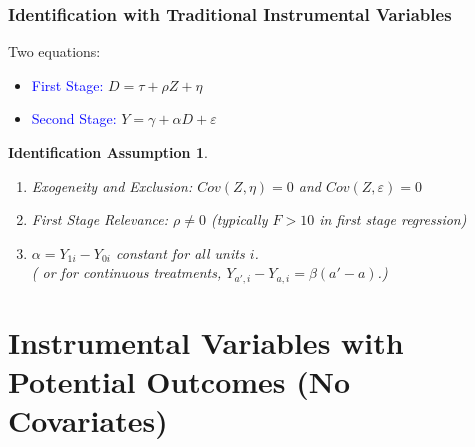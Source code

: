 \documentclass[xcolor=dvipsnames]{beamer}
\newtheorem{iass}{Identification Assumption}
\begin{document}
\begin{frame}
  \frametitle{Identification with Traditional Instrumental Variables}
\begin{definition}
Two equations:
\begin{itemize}
\item \textcolor{Blue}{First Stage:} $D=\tau+\rho Z+ \eta$ 
\item \textcolor{Blue}{Second Stage:} $Y=\gamma+\alpha D+ \varepsilon$ 
\end{itemize}
\end{definition}
\begin{iass}
\begin{enumerate}
  \item Exogeneity and Exclusion: $Cov(Z,\eta)=0$ and $Cov(Z,\varepsilon)=0$
  \item First Stage Relevance: $\rho\neq0$ \footnotesize (typically $F>10$ in first stage regression)
  \normalsize
  \item $\alpha=Y_{1i}-Y_{0i}$ constant for all units $i$.\\ ( \scriptsize or for continuous treatments, $Y_{a',i}-Y_{a,i} = \beta (a'-a)$.)
\end{enumerate}
\end{iass}\vspace{-.2in}
\end{frame}



%
%
%
%
%
%
%

\section{Instrumental Variables with Potential Outcomes (No Covariates)}
\end{document}

